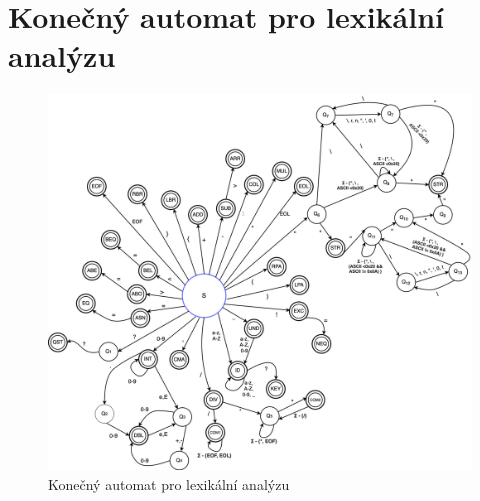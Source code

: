 \documentclass[a4paper, 11pt]{article}
\begin{document}
\newpage
\section*{Konečný automat pro lexikální analýzu}
\begin{figure}[!ht]
	\centering
	\vspace{-0.8cm}
	\includegraphics[width=1\linewidth]{include/aaaaa.drawio.png}
	\caption{Konečný automat pro lexikální analýzu}
	\label{fig:fa}
\end{figure}
\end{document}
